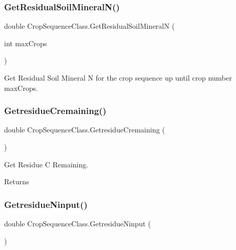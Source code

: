 \subsubsection{\texorpdfstring{GetResidualSoilMineralN()}{GetResidualSoilMineralN()}\hspace{0.1cm}{\footnotesize\ttfamily [2/2]}}
{\footnotesize\ttfamily double Crop\+Sequence\+Class.\+Get\+Residual\+Soil\+MineralN (\begin{DoxyParamCaption}\item[{int}]{max\+Crops }\end{DoxyParamCaption})\hspace{0.3cm}{\ttfamily [inline]}}



Get Residual Soil Mineral N for the crop sequence up until crop number max\+Crops. 

\mbox{\label{class_crop_sequence_class_a387a4ec45e99e4110fc538908a6d2bb9}} 
\subsubsection{\texorpdfstring{GetresidueCremaining()}{GetresidueCremaining()}}
{\footnotesize\ttfamily double Crop\+Sequence\+Class.\+Getresidue\+Cremaining (\begin{DoxyParamCaption}{ }\end{DoxyParamCaption})\hspace{0.3cm}{\ttfamily [inline]}}



Get Residue C Remaining. 

\begin{DoxyReturn}{Returns}

\end{DoxyReturn}
\mbox{\label{class_crop_sequence_class_a68765f1adc5627b9c44f53c38d3620d3}} 
\subsubsection{\texorpdfstring{GetresidueNinput()}{GetresidueNinput()}}
{\footnotesize\ttfamily double Crop\+Sequence\+Class.\+Getresidue\+Ninput (\begin{DoxyParamCaption}{ }\end{DoxyParamCaption})\hspace{0.3cm}{\ttfamily [inline]}}



